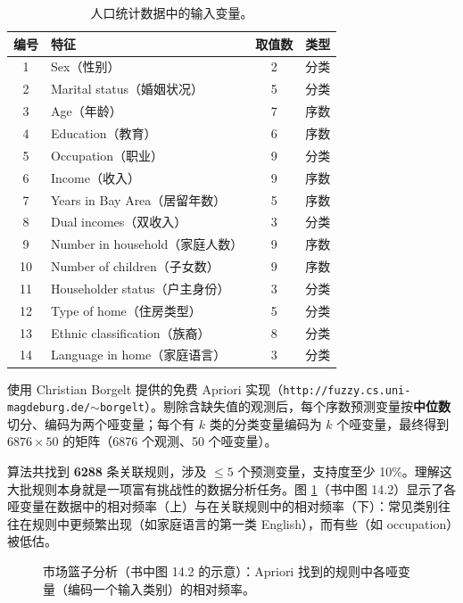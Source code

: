 \begin{table}[htbp]
\centering
\caption{人口统计数据中的输入变量。}
\label{tab:14_1}
\begin{tabular}{clcl}
\toprule
编号 & 特征 & 取值数 & 类型 \\
\midrule
1  & Sex（性别）               & 2 & 分类 \\
2  & Marital status（婚姻状况） & 5 & 分类 \\
3  & Age（年龄）               & 7 & 序数 \\
4  & Education（教育）         & 6 & 序数 \\
5  & Occupation（职业）        & 9 & 分类 \\
6  & Income（收入）            & 9 & 序数 \\
7  & Years in Bay Area（居留年数） & 5 & 序数 \\
8  & Dual incomes（双收入）    & 3 & 分类 \\
9  & Number in household（家庭人数）& 9 & 序数 \\
10 & Number of children（子女数）& 9 & 序数 \\
11 & Householder status（户主身份）& 3 & 分类 \\
12 & Type of home（住房类型）   & 5 & 分类 \\
13 & Ethnic classification（族裔）& 8 & 分类 \\
14 & Language in home（家庭语言）& 3 & 分类 \\
\bottomrule
\end{tabular}
\end{table}

使用 Christian Borgelt 提供的免费 Apriori 实现（\texttt{http://fuzzy.cs.uni-magdeburg.de/$\sim$borgelt}）。剔除含缺失值的观测后，每个序数预测变量按\textbf{中位数}切分、编码为两个哑变量；每个有 $k$ 类的分类变量编码为 $k$ 个哑变量，最终得到 $6876\times 50$ 的矩阵（6876 个观测、50 个哑变量）。

算法共找到 \textbf{6288} 条关联规则，涉及 $\le 5$ 个预测变量，支持度至少 10\%。理解这大批规则本身就是一项富有挑战性的数据分析任务。图 \ref{fig:14_2}（书中图 14.2）显示了各哑变量在数据中的相对频率（上）与在关联规则中的相对频率（下）：常见类别往往在规则中更频繁出现（如家庭语言的第一类 English），而有些（如 occupation）被低估。

\begin{figure}[htbp]
\centering
{}
\caption{市场篮子分析（书中图 14.2 的示意）：Apriori 找到的规则中各哑变量（编码一个输入类别）的相对频率。}
\label{fig:14_2}
\end{figure}

